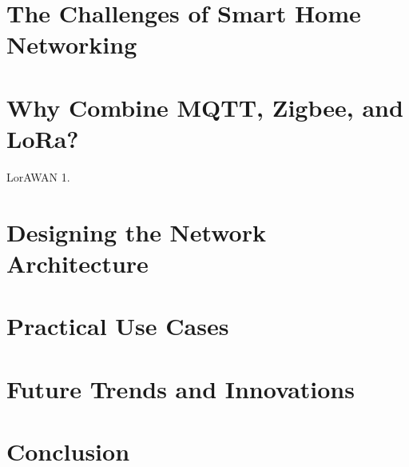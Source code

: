 \documentclass[article,a4paper]{IEEEtran}
\begin{document}
    \section{The Challenges of Smart Home Networking}

    \section{Why Combine MQTT, Zigbee, and LoRa?}

    LorAWAN
    1. 

    \section{Designing the Network Architecture}

    \section{Practical Use Cases}

    \section{Future Trends and Innovations}

    \section{Conclusion}

\printbibliography
\end{document}
